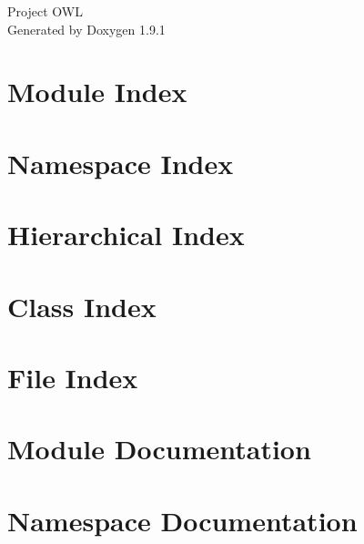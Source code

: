 \let\mypdfximage\pdfximage\def\pdfximage{\immediate\mypdfximage}\documentclass[twoside]{book}
\newcommand{\+}{\discretionary{\mbox{\scriptsize$\hookleftarrow$}}{}{}}
\newcommand{\clearemptydoublepage}{%
  \newpage{\pagestyle{empty}\cleardoublepage}%
}
\begin{document}
\raggedbottom

\hypersetup{pageanchor=false,
             bookmarksnumbered=true,
             pdfencoding=unicode
            }
\begin{titlepage}
\vspace*{7cm}
\begin{center}%
{\Large Project OWL }\\
\vspace*{1cm}
{\large Generated by Doxygen 1.9.1}\\
\end{center}
\end{titlepage}
\clearemptydoublepage
{}
\tableofcontents
\clearemptydoublepage
{}
\hypersetup{pageanchor=true}

\chapter{Module Index}

\chapter{Namespace Index}

\chapter{Hierarchical Index}

\chapter{Class Index}

\chapter{File Index}

\chapter{Module Documentation}


\chapter{Namespace Documentation}

\end{document}
